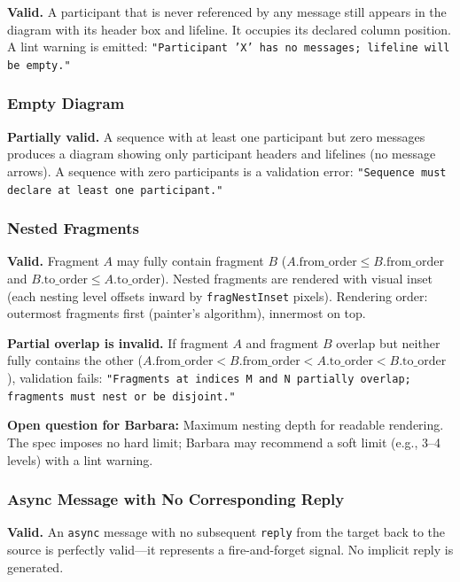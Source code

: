 \textbf{Valid.} A participant that is never referenced by any message still appears in the diagram with its header box and lifeline. It occupies its declared column position. A lint warning is emitted: \texttt{"Participant 'X' has no messages; lifeline will be empty."}

\subsubsection{Empty Diagram}

\textbf{Partially valid.} A sequence with at least one participant but zero messages produces a diagram showing only participant headers and lifelines (no message arrows). A sequence with zero participants is a validation error: \texttt{"Sequence must declare at least one participant."}

\subsubsection{Nested Fragments}

\textbf{Valid.} Fragment $A$ may fully contain fragment $B$ ($A.\text{from\_order} \le B.\text{from\_order}$ and $B.\text{to\_order} \le A.\text{to\_order}$). Nested fragments are rendered with visual inset (each nesting level offsets inward by \texttt{fragNestInset} pixels). Rendering order: outermost fragments first (painter's algorithm), innermost on top.

\textbf{Partial overlap is invalid.} If fragment $A$ and fragment $B$ overlap but neither fully contains the other ($A.\text{from\_order} < B.\text{from\_order} < A.\text{to\_order} < B.\text{to\_order}$), validation fails: \texttt{"Fragments at indices M and N partially overlap; fragments must nest or be disjoint."}

\textbf{Open question for Barbara:} Maximum nesting depth for readable rendering. The spec imposes no hard limit; Barbara may recommend a soft limit (e.g., 3--4 levels) with a lint warning.

\subsubsection{Async Message with No Corresponding Reply}

\textbf{Valid.} An \texttt{async} message with no subsequent \texttt{reply} from the target back to the source is perfectly valid---it represents a fire-and-forget signal. No implicit reply is generated.


